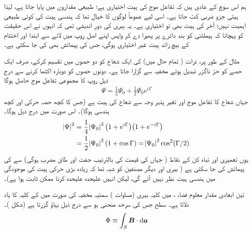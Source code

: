  ہم اس سوچ کے عادی ہیں کہ تفاعل موج کی ہیت اختیاری ہے؛ طبیعی مقداروں میں  پایا جاتا ہے، لہٰذا ہیتی جزو ضربی کٹ جاتا ہے۔ اسی لیے عموماً لوگوں کا خیال تھا کہ ہندسی ہیت کی کوئی طبیعی اہمیت نہیں؛ آخر  کی ہیت بھی تو اختیاری ہے۔ یہ بیری کی دور اندیشی تھی کہ انہوں نے اس حقیقت کو پہچانا کہ ہیملٹنی کو بند دائرے پر پھیرا دے کر واپس اپنے اصل روپ میں لانے سے ابتدا اور اختتام کے بیچ زائد ہیت غیر اختیاری ہوگی، جس کی پیمائش بھی کی جا سکتی ہے۔
 
 مثال کے طور پر، ذرات ( تمام حال  میں) کی ایک شعاع کو دو حصوں میں تقسیم کرکے، صرف ایک حصے کو حرّ ناگزر تبدیل ہوتے مخفیہ سے گزارا جاتا ہے۔ دونوں حصوں کو دوبارہ اکٹھا کرنے سے درج ذیل روپ کا مجموعی تفاعل موج حاصل ہوگا 
\begin{align}
\Psi = \frac{1}{2} \Psi_0 + \frac{1}{2} \Psi_0 e^{i \Gamma}
\end{align}
جہاں   شعاع کا تفاعل موج اور  تغیر پذیر  وجہ سے شعاع کی  ہیت ہے (جس کا کچھ حصہ حرکی اور کچھ ہندسی ہوگا)۔ اس صورت میں درج ذیل ہوگا۔
\begin{align}\label{مساوات_حر_ہیّتی_انتقال}
\abs{\Psi}^2 &= \frac{1}{4} \abs{\Psi_0}^2 \big ( 1 + e^{i \Gamma} \big ) \big ( 1 + e^{- i \Gamma} \big ) \nonumber\\
&= \frac{1}{2} \abs{\Psi_0}^2 (1 + \cos \Gamma) = \abs{\Psi_0}^2 \cos^2 (\Gamma/2)
\end{align}
یوں تعمیری اور تباہ کن کے نقاط ( جہاں  کی قیمت  کی بالترتیب جفت اور طاق مضرب ہوگی) سے  کی پیمائش کی جا سکتی ہے ( بیری اور دیگر مصنفین کو شبہ تھا کہ زیادہ بڑی حرکی ہیت کی موجودگی میں ہندسی ہیت نظر نہیں آئے گی، لیکن انہیں علیحدہ علیحدہ کرنا ممکن ثابت ہوا ہے)۔ 

 تین ابعادی مقدار معلوم فضا، ، میں کلیہ بیری (مساوات ) سمتیہ مخفیہ  کی صورت میں  کے کلیہ کا یاد دلاتا ہے۔ سطح  جس کی سرحد منحنی  ہو سے درج ذیل بہاؤ گزرتا ہے (شکل )۔ 
\begin{align}
\Phi \equiv \int_S \kvec{B} \cdot \dif \kvec{a}
\end{align}

